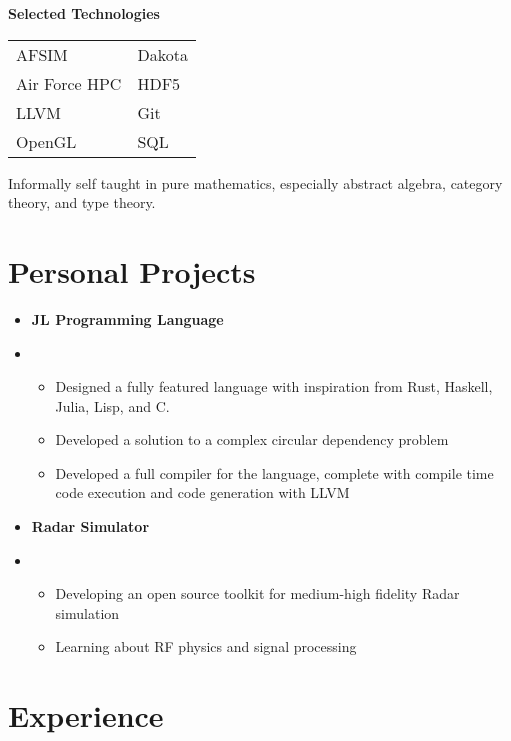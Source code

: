 \documentclass[10pt]{article}
\begin{document}
\begin{paracol}{2}
{        \begin{center}
            \textbf{Selected Technologies}
        \end{center}
        \begin{tabularx}{\linewidth}{YY}
            AFSIM         & Dakota \\
            Air Force HPC & HDF5   \\
            LLVM          & Git    \\
            OpenGL        & SQL
        \end{tabularx}

        \medskip

        Informally self taught in pure mathematics, especially abstract algebra,
        category theory, and type theory.
    }

    \section*{Personal Projects}
    \parbox[top][][c]{\linewidth}{
        \begin{itemize}
            \item[] \textbf{JL Programming Language}
            \item[] \begin{itemize}
                    \item Designed a fully featured language with inspiration from Rust, Haskell, Julia, Lisp, and C.
                    \item Developed a solution to a complex circular dependency problem
                    \item Developed a full compiler for the language, complete with compile time code execution and code generation with LLVM
                \end{itemize}
            \item[] \textbf{Radar Simulator}
            \item[] \begin{itemize}
                    \item Developing an open source toolkit for medium-high fidelity Radar simulation
                    \item Learning about RF physics and signal processing
                \end{itemize}
        \end{itemize}
    }

    \switchcolumn

    \section*{Experience}


\end{paracol}
\end{document}
